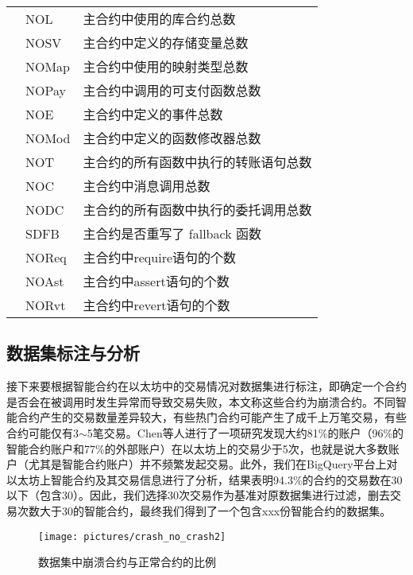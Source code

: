 \begin{table}[htbp]
\begin{tabularx}{\linewidth}{cp{3.5cm}<{\centering}X<{\raggedright}}
                                       & NOL                & 主合约中使用的库合约总数\\
                                       & NOSV                & 主合约中定义的存储变量总数 \\
                                       & NOMap              & 主合约中使用的映射类型总数 \\
                                       & NOPay               & 主合约中调用的可支付函数总数 \\
                                       & NOE                 & 主合约中定义的事件总数 \\
                                       & NOMod               &  主合约中定义的函数修改器总数 \\
                                       & NOT                 & 主合约的所有函数中执行的转账语句总数 \\
                                       & NOC                 & 主合约中消息调用总数 \\
                                       & NODC                & 主合约的所有函数中执行的委托调用总数 \\
                                       & SDFB                & 主合约是否重写了 fallback 函数 \\ 
                                       & NOReq         & 主合约中require语句的个数 \\
                                       & NOAst         & 主合约中assert语句的个数 \\
                                       & NORvt         & 主合约中revert语句的个数 \\ \hline
        \end{tabularx}
\end{table}
\subsection{数据集标注与分析}
接下来要根据智能合约在以太坊中的交易情况对数据集进行标注，即确定一个合约是否会在被调用时发生异常而导致交易失败，本文称这些合约为崩溃合约。不同智能合约产生的交易数量差异较大，有些热门合约可能产生了成千上万笔交易，有些合约可能仅有3$\sim$5笔交易。Chen等人进行了一项研究\cite{chen2020understand}发现大约81\%的账户（96\%的智能合约账户和77\%的外部账户）在以太坊上的交易少于5次，也就是说大多数账户（尤其是智能合约账户）并不频繁发起交易。此外，我们在BigQuery平台上对以太坊上智能合约及其交易信息进行了分析，结果表明94.3\%的合约的交易数在30以下（包含30）。因此，我们选择30次交易作为基准对原数据集进行过滤，删去交易次数大于30的智能合约，最终我们得到了一个包含xxx份智能合约的数据集。
\begin{figure}[htbp]
    \centering
    \texttt{[image: pictures/crash\_no\_crash2]}
    \caption{\label{fig:crash_no_crash2}数据集中崩溃合约与正常合约的比例}
\end{figure}

